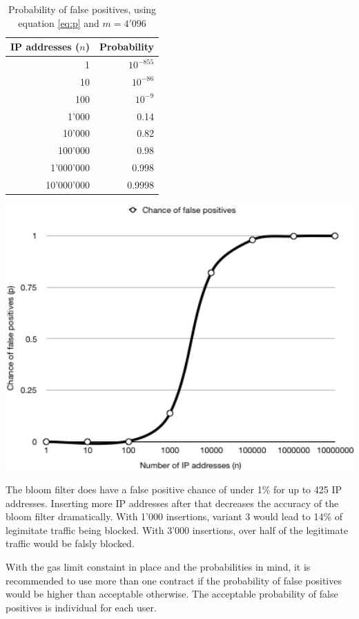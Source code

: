 \begin{table}[ht]
\begin{minipage}[b]{.45\textwidth}
        \begin{tabular}{r | r}
            \hline
            IP addresses ($n$) & Probability \\ \hline
            1 & $10^{-855}$ \\ \hline
            10 & $10^{-86}$ \\ \hline
            100 & $10^{-9}$ \\ \hline
            1'000 & 0.14 \\ \hline
            10'000 & 0.82 \\ \hline
            100'000 & 0.98 \\ \hline
            1'000'000 & 0.998 \\ \hline
            10'000'000 & 0.9998 \\ \hline
        \end{tabular}
            \caption{Probability of false positives, using equation \ref{eq:p} and $m = 4'096$}
            \label{table:Probability}
\end{minipage}
\hspace{.1\textwidth}
\begin{minipage}[b]{.45\textwidth}
        \includegraphics[width=1\textwidth]{v3-chance.png}
        \label{fig:Probability}
\end{minipage}
\end{table}

The bloom filter does have a false positive chance of under 1\% for up to 425 IP addresses. Inserting more IP addresses after that decreases the accuracy of the bloom filter dramatically. With 1'000 insertions, variant 3 would lead to 14\% of legimitate traffic being blocked. With 3'000 insertions, over half of the legitimate traffic would be falsly blocked.

With the gas limit constaint in place and the probabilities in mind, it is recommended to use more than one contract if the probability of false positives would be higher than acceptable otherwise. The acceptable probability of false positives is individual for each user.

